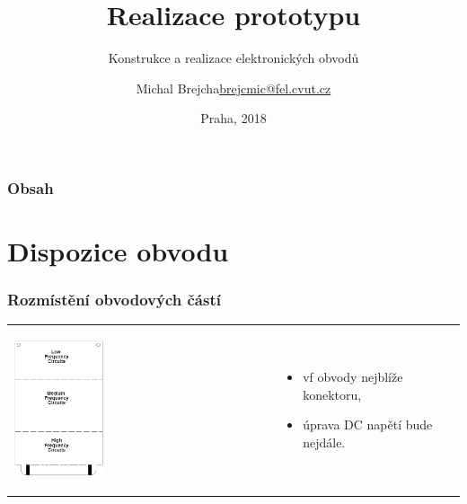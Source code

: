 \documentclass{beamer}
\title[Realizace prototypu]{Realizace prototypu}
\subtitle[KEO] {Konstrukce a realizace elektronických obvodů}
\author[Brejcha]{\texorpdfstring{Michal Brejcha\newline\url{brejcmic@fel.cvut.cz}}{Michal Brejcha}}
\institute[ČVUT]{ČVUT v Praze, FEL}
\date[Praha, 2018]{Praha, 2018}
\begin{document}
\frame{\titlepage}

\begin{frame}
\frametitle{Obsah} 
\tableofcontents
\end{frame}


\section{\texorpdfstring{Dispozice obvodu}{Dispozice obvodu}}
  \begin{frame}
    \frametitle{Rozmístění obvodových částí}
    
			\begin{tabular}{ p{55mm} p{55mm} }
				\begin{center}
					\includegraphics[width=0.35\textwidth]{obr/dispozice.png} 
				\end{center} &
				
				\begin{itemize}
					\item vf obvody nejblíže konektoru,
					\item úprava DC napětí bude nejdále.
				\end{itemize}
			\end{tabular}
    
  \end{frame}
\end{document}
